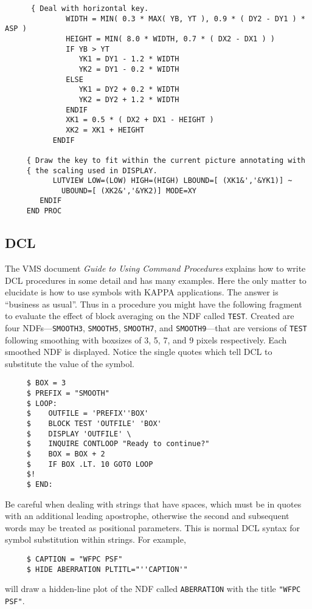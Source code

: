 {\begin{verbatim}
      { Deal with horizontal key.
              WIDTH = MIN( 0.3 * MAX( YB, YT ), 0.9 * ( DY2 - DY1 ) * ASP )
              HEIGHT = MIN( 8.0 * WIDTH, 0.7 * ( DX2 - DX1 ) )
              IF YB > YT
                 YK1 = DY1 - 1.2 * WIDTH
                 YK2 = DY1 - 0.2 * WIDTH
              ELSE
                 YK1 = DY2 + 0.2 * WIDTH
                 YK2 = DY2 + 1.2 * WIDTH
              ENDIF
              XK1 = 0.5 * ( DX2 + DX1 - HEIGHT )
              XK2 = XK1 + HEIGHT
           ENDIF

     { Draw the key to fit within the current picture annotating with 
     { the scaling used in DISPLAY.
           LUTVIEW LOW=(LOW) HIGH=(HIGH) LBOUND=[ (XK1&','&YK1)] ~
             UBOUND=[ (XK2&','&YK2)] MODE=XY
        ENDIF
     END PROC
\end{verbatim}
\normalsize

\subsection{DCL}
The VMS document {\sl Guide to Using Command Procedures} explains
how to write {\small DCL} procedures in some detail and has many
examples. Here the only matter to elucidate is how to use symbols with
{\small KAPPA} applications.  The answer is ``business as usual''.  Thus
in a procedure you might have the following fragment to evaluate
the effect of block averaging on the NDF called {\tt TEST}.  Created are
four NDFs---{\tt SMOOTH3}, {\tt SMOOTH5}, {\tt SMOOTH7}, and
{\tt SMOOTH9}---that are versions of {\tt TEST} following smoothing with
boxsizes of 3, 5, 7, and 9 pixels respectively.  Each smoothed NDF
is displayed.  Notice the single quotes which tell {\small DCL} to
substitute the value of the symbol.

\small
\begin{verbatim}
     $ BOX = 3
     $ PREFIX = "SMOOTH"
     $ LOOP:
     $    OUTFILE = 'PREFIX''BOX'
     $    BLOCK TEST 'OUTFILE' 'BOX'
     $    DISPLAY 'OUTFILE' \
     $    INQUIRE CONTLOOP "Ready to continue?"
     $    BOX = BOX + 2
     $    IF BOX .LT. 10 GOTO LOOP
     $!
     $ END:
\end{verbatim}
\normalsize
Be careful when dealing with strings that have spaces, which must be in
quotes with an additional leading apostrophe, otherwise the second and
subsequent words may be treated as positional parameters.  This is
normal {\small DCL} syntax for symbol substitution within strings.  For
example,

\small
\begin{verbatim}
     $ CAPTION = "WFPC PSF"
     $ HIDE ABERRATION PLTITL="''CAPTION'"
\end{verbatim}
\normalsize
will draw a hidden-line plot of the NDF called {\tt ABERRATION} with the
title {\tt "WFPC PSF"}.

}
